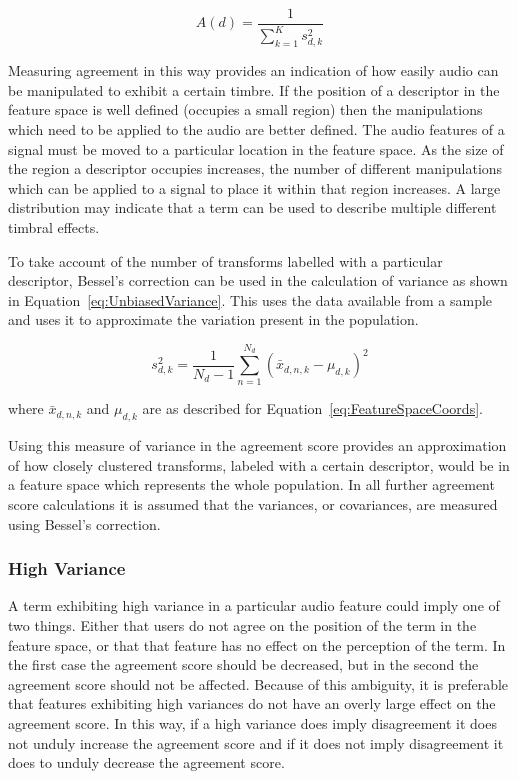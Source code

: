 			\begin{equation}
				A(d) = \frac{1}{\sum_{k = 1}^{K} s_{d,k}^{2}}
				\label{eq:ReciprocalOfSumAgreement}
			\end{equation}

			Measuring agreement in this way provides an indication of how easily audio can be manipulated to
			exhibit a certain timbre. If the position of a descriptor in the feature space is well defined
			(occupies a small region) then the manipulations which need to be applied to the audio are better
			defined. The audio features of a signal must be moved to a particular location in the feature
			space. As the size of the region a descriptor occupies increases, the number of different
			manipulations which can be applied to a signal to place it within that region increases. A large
			distribution may indicate that a term can be used to describe multiple different timbral effects.

			To take account of the number of transforms labelled with a particular descriptor, Bessel's
			correction can be used in the calculation of variance as shown in
			Equation~\ref{eq:UnbiasedVariance}. This uses the data available from a sample and uses it to
			approximate the variation present in the population.

			\begin{equation}
				s_{d,k}^{2} = \frac{1}{N_{d} - 1} \sum_{n = 1}^{N_{d}} (\bar{x}_{d,n,k} - \mu_{d,k})^{2}
				\label{eq:UnbiasedVariance}
			\end{equation}

			where $\bar{x}_{d,n,k}$ and $\mu_{d,k}$ are as described for Equation~\ref{eq:FeatureSpaceCoords}.

			Using this measure of variance in the agreement score provides an approximation of how closely
			clustered transforms, labeled with a certain descriptor, would be in a feature space which
			represents the whole population. In all further agreement score calculations it is assumed that the
			variances, or covariances, are measured using Bessel's correction.

		\subsubsection*{High Variance}
			A term exhibiting high variance in a particular audio feature could imply one of two things. Either
			that users do not agree on the position of the term in the feature space, or that that feature has
			no effect on the perception of the term. In the first case the agreement score should be decreased,
			but in the second the agreement score should not be affected. Because of this ambiguity, it is
			preferable that features exhibiting high variances do not have an overly large effect on the
			agreement score.  In this way, if a high variance does imply disagreement it does not unduly
			increase the agreement score and if it does not imply disagreement it does to unduly decrease the
			agreement score.
			
